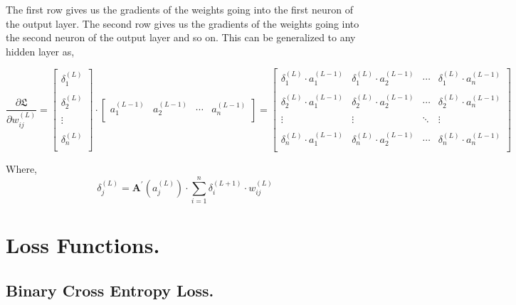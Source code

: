 \documentclass[12pt]{article}
\begin{document}
The first row gives us the gradients of the weights going into the first neuron of the output layer. The second row gives us the gradients of the weights going into the second neuron of the output layer and so on. This can be generalized to any hidden layer as, 

\[
    \dfrac{\partial \mathfrak{L} }{\partial w_{ij}^{(L)}} = \begin{bmatrix}
     \delta_1 ^{(L)} \\
     \\
     \delta_2 ^{(L)} \\
     \\
     \vdots\\
     \\
     \delta_n ^{(L)} \\
  \end{bmatrix} \cdot \begin{bmatrix}
     a_1 ^{(L-1)} &  a_2 ^{(L-1)} & \cdots & a_n ^{(L-1)} \\
  \end{bmatrix} = 
    \begin{bmatrix}
      \delta_1 ^{(L)} \cdot a_1 ^{(L-1)} & \delta_1 ^{(L)} \cdot a_2 ^{(L-1)}  & \cdots & \delta_1 ^{(L)} \cdot a_n ^{(L-1)} \\
      \\
      \delta_2 ^{(L)} \cdot a_1 ^{(L-1)} & \delta_2 ^{(L)} \cdot a_2 ^{(L-1)}  & \cdots & \delta_2 ^{(L)} \cdot a_n ^{(L-1)} \\
      \\
      \vdots & \vdots & \ddots & \vdots \\
      \\
      \delta_n ^{(L)} \cdot a_1 ^{(L-1)} & \delta_n ^{(L)} \cdot a_2 ^{(L-1)}  & \cdots & \delta_n ^{(L)} \cdot a_n ^{(L-1)} \\
    \end{bmatrix}
\]

Where, 
\[
  \delta^{(L)}_j = \mathbf{A} ^{\prime} (a_j ^{(L)}) \cdot \sum_{i=1}^{n} \delta_i ^{(L+1)} \cdot w_{ij}^{(L)}
\] 

\newpage

\section*{Loss Functions.}

\subsection*{Binary Cross Entropy Loss.}
\end{document}
